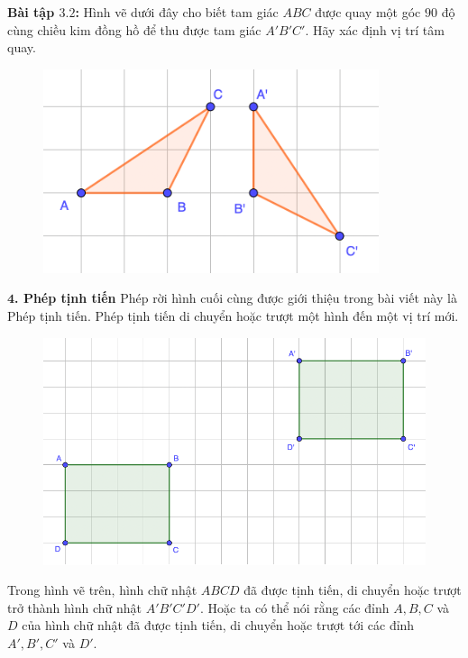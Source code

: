\begin{multicols}{2}
\begin{figure}[H]
		\vspace*{-10pt}
	\end{figure}
	\textbf{\color{toancuabi}Bài tập $\pmb{3.2}$:} Hình vẽ dưới đây cho biết tam giác $ABC$ được quay một góc $90$ độ cùng chiều kim đồng hồ để thu được tam giác $A'B'C'$. Hãy xác định vị trí tâm quay.
	\begin{figure}[H]
		\vspace*{-5pt}
		\centering
		\captionsetup{labelformat= empty, justification=centering}
		\includegraphics[width= 0.6\linewidth]{Picture28}
		\vspace*{-10pt}
	\end{figure}
	\textbf{\color{toancuabi}$\pmb4$. Phép tịnh tiến}
	\vskip 0.1cm
	Phép rời hình cuối cùng được giới thiệu trong bài viết này là Phép tịnh tiến. Phép tịnh tiến di chuyển hoặc trượt một hình đến một vị trí mới.
	\begin{figure}[H]
		\vspace*{-5pt}
		\centering
		\captionsetup{labelformat= empty, justification=centering}
		\includegraphics[width= 1\linewidth]{Picture29}
		\vspace*{-10pt}
	\end{figure}
	Trong hình vẽ trên, hình chữ nhật $ABCD$ đã được tịnh tiến, di chuyển hoặc trượt trở thành hình chữ nhật $A'B'C'D'$. Hoặc ta có thể nói rằng các đỉnh $A,B,C$ và $D$ của hình chữ nhật đã được tịnh tiến, di chuyển hoặc trượt tới các đỉnh $A',B',C'$ và $D'$.

\end{multicols}
